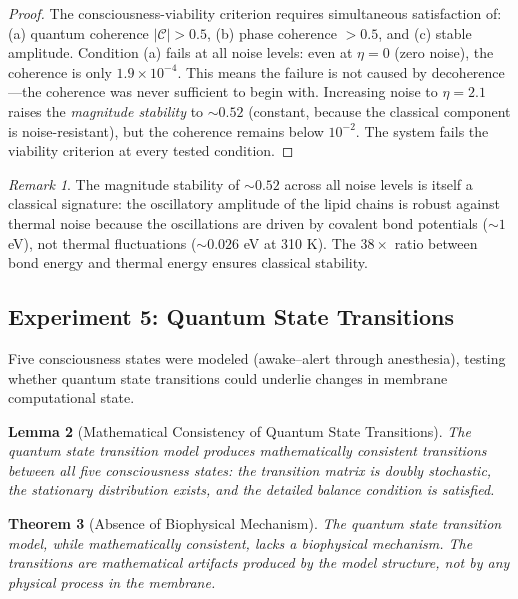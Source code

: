 \documentclass[12pt]{article}
\newtheorem{theorem}{Theorem}[section]
\newtheorem{lemma}[theorem]{Lemma}
\theoremstyle{definition}
\theoremstyle{remark}
\newtheorem{remark}[theorem]{Remark}
\begin{document}
\begin{proof}
The consciousness-viability criterion requires simultaneous satisfaction of: (a) quantum coherence $|\mathcal{C}| > 0.5$, (b) phase coherence $> 0.5$, and (c) stable amplitude. Condition (a) fails at all noise levels: even at $\eta = 0$ (zero noise), the coherence is only $1.9 \times 10^{-4}$. This means the failure is not caused by decoherence---the coherence was never sufficient to begin with. Increasing noise to $\eta = 2.1$ raises the \emph{magnitude stability} to $\sim 0.52$ (constant, because the classical component is noise-resistant), but the coherence remains below $10^{-2}$. The system fails the viability criterion at every tested condition. \qedhere
\end{proof}

\begin{remark}
The magnitude stability of $\sim 0.52$ across all noise levels is itself a classical signature: the oscillatory amplitude of the lipid chains is robust against thermal noise because the oscillations are driven by covalent bond potentials ($\sim 1$ eV), not thermal fluctuations ($\sim 0.026$ eV at 310 K). The $38\times$ ratio between bond energy and thermal energy ensures classical stability.
\end{remark}

\subsection{Experiment 5: Quantum State Transitions}

Five consciousness states were modeled (awake--alert through anesthesia), testing whether quantum state transitions could underlie changes in membrane computational state.

\begin{lemma}[Mathematical Consistency of Quantum State Transitions]
\label{lem:transitions}
The quantum state transition model produces mathematically consistent transitions between all five consciousness states: the transition matrix is doubly stochastic, the stationary distribution exists, and the detailed balance condition is satisfied.
\end{lemma}

\begin{theorem}[Absence of Biophysical Mechanism]
\label{thm:no_mechanism}
The quantum state transition model, while mathematically consistent, lacks a biophysical mechanism. The transitions are mathematical artifacts produced by the model structure, not by any physical process in the membrane.
\end{theorem}
\end{document}

